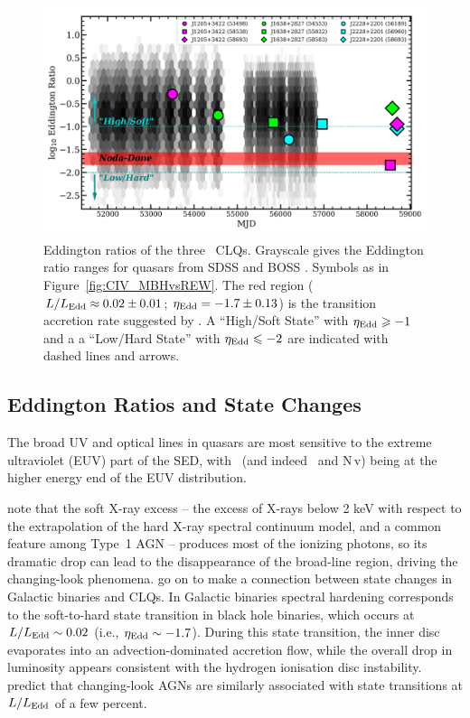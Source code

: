 \documentclass[fleqn,usenatbib]{mnras}
\begin{document}
\begin{figure}
  \centering
  \includegraphics[width=14.5cm, trim=0.2cm 0.2cm 0.0cm 0.2cm, clip]
  {figures/MJD_vs_Eddington_20200710}
  \vspace{-12pt}
  \caption[]{Eddington ratios of the three \civ\ CLQs.  Grayscale gives the
    Eddington ratio ranges for quasars from SDSS \citet[][]{Shen2011} and
    BOSS \citep[][]{Kozlowski2017}.  Symbols as in
    Figure~\ref{fig:CIV_MBHvsREW}.  The red region ($L / L_{\rm Edd}
    \approx 0.02 \pm 0.01$; $\eta_{\rm Edd} = -1.7 \pm 0.13$) is the
    transition accretion rate suggested by \citet{NodaDone2018}.  A
    ``High/Soft State'' with $\eta_{\rm Edd} \geq -1$ and a a ``Low/Hard
    State'' with $\eta_{\rm Edd} \leq -2$ are indicated with dashed lines
    and arrows.}
  \label{fig:Eddington_ratios}
\end{figure}

\subsection{Eddington Ratios and State Changes} 
The broad UV and optical lines in quasars are most sensitive to the
extreme ultraviolet (EUV) part of the SED, with \civ\ (and indeed 
\heii\ and N\,{\sc v}) being at the higher energy end of the EUV
distribution.

\citet{NodaDone2018} note that the soft X-ray excess -- the excess of
X-rays below 2 keV with respect to the extrapolation of the hard X-ray
spectral continuum model, and a common feature among Type~1 AGN --
produces most of the ionizing photons, so its dramatic drop can lead
to the disappearance of the broad-line region, driving the
changing-look phenomena. \citet{NodaDone2018} go on to make a
connection between state changes in Galactic binaries and CLQs.  In
Galactic binaries spectral hardening corresponds to the soft-to-hard
state transition in black hole binaries, which occurs at $L / L_{\rm
Edd} \sim 0.02$ (i.e., $\eta_{\rm Edd} \sim -1.7$).  During this state
transition, the inner disc evaporates into an advection-dominated
accretion flow, while the overall drop in luminosity appears
consistent with the hydrogen ionisation disc instability.
\citet{NodaDone2018} predict that changing-look AGNs are similarly
associated with state transitions at $L / L_{\rm Edd}$ of a few
percent.
\end{document}
